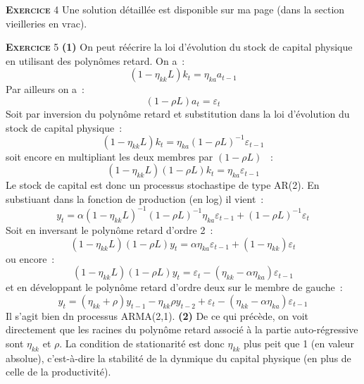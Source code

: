 \documentclass[12pt,a4paper,notitlepage]{article}
\newcommand{\exercice}[1]{\textsc{\textbf{Exercice}} #1}
\begin{document}
\bigskip

\exercice{4} Une solution détaillée est disponible sur ma page (dans la section vieilleries en vrac).\newline

\bigskip

\exercice{5} \textbf{(1)} On peut réécrire la loi d'évolution du stock de capital physique en utilisant des polynômes retard. On a :
\[
  (1-\eta_{kk}L)k_{t} = \eta_{ka} a_{t-1}
\]
Par ailleurs on a :
\[
(1-\rho L) a_{t} = \varepsilon_{t} 
\]
Soit par inversion du polynôme retard et substitution dans la loi d'évolution du stock de capital physique :
\[
  (1-\eta_{kk}L)k_{t} = \eta_{ka} (1-\rho L)^{-1} \varepsilon_{t-1}
\]
soit encore en multipliant les deux membres par $(1-\rho L)$  :
\[
(1-\eta_{kk}L)(1-\rho L)k_{t} = \eta_{ka} \varepsilon_{t-1}
\]
Le stock de capital est donc un processus stochastipe de type AR(2). En substiuant dans la fonction de production (en log) il vient :
\[
y_{t} = \alpha (1-\eta_{kk}L)^{-1}(1-\rho L)^{-1} \eta_{ka} \varepsilon_{t-1} + (1-\rho L)^{-1}\varepsilon_{t}
\]
Soit en inversant le polynôme retard d'ordre 2 :
\[
(1-\eta_{kk}L)(1-\rho L) y_{t} = \alpha \eta_{ka} \varepsilon_{t-1} + (1-\eta_{kk})\varepsilon_{t}
\]
ou encore :
\[
(1-\eta_{kk}L)(1-\rho L) y_{t} = \varepsilon_{t} - (\eta_{kk}-\alpha\eta_{ka}) \varepsilon_{t-1}
\]
et en développant le polynôme retard d'ordre deux sur le membre de gauche :
\[
y_{t} = (\eta_{kk}+\rho)y_{t-1} - \eta_{kk}\rho y_{t-2} + \varepsilon_{t} - (\eta_{kk}-\alpha\eta_{ka}) \varepsilon_{t-1}
\]
Il s'agit bien dn processus ARMA(2,1). \textbf{(2)} De ce qui précède, on voit directement que les racines du polynôme retard associé à la partie auto-régressive sont $\eta_{kk}$ et $\rho$. La condition de stationarité est donc $\eta_{kk}$ plus peit que 1 (en valeur absolue), c'est-à-dire la stabilité de la dynmique du capital physique (en plus de celle de la productivité). 
\end{document}
